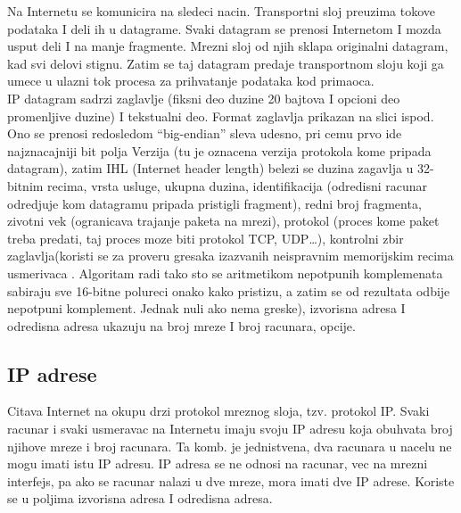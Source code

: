 \documentclass{article} %
\begin{document}
Na Internetu se komunicira na sledeci nacin. Transportni sloj preuzima tokove podataka I deli ih u datagrame. Svaki datagram se prenosi Internetom I mozda usput deli I na  manje fragmente. Mrezni sloj od njih sklapa originalni datagram, kad svi delovi stignu. Zatim se taj datagram predaje transportnom sloju koji ga umece u ulazni tok procesa za prihvatanje podataka kod primaoca.\\

IP datagram sadrzi zaglavlje (fiksni deo duzine 20 bajtova I opcioni deo promenljive duzine) I tekstualni deo. Format zaglavlja prikazan na slici ispod. Ono se prenosi redosledom  “big-endian” sleva udesno, pri cemu prvo ide najznacajniji bit polja Verzija (tu je oznacena verzija protokola kome pripada datagram), zatim IHL (Internet header length) belezi se duzina zagavlja u 32-bitnim recima, vrsta usluge, ukupna duzina, identifikacija (odredisni racunar odredjuje kom  datagramu pripada pristigli fragment), redni broj fragmenta, zivotni vek (ogranicava trajanje paketa na mrezi), protokol (proces kome paket treba predati, taj proces moze biti protokol TCP, UDP…), kontrolni zbir zaglavlja(koristi se za proveru gresaka izazvanih neispravnim memorijskim recima usmerivaca . Algoritam radi tako sto se aritmetikom nepotpunih komplemenata sabiraju sve 16-bitne polureci onako kako pristizu, a zatim se od rezultata odbije nepotpuni komplement. Jednak nuli ako nema greske), izvorisna adresa I odredisna adresa ukazuju na broj mreze I broj racunara, opcije.
\subsection{IP adrese}
Citava Internet na okupu drzi protokol mreznog sloja, tzv. protokol IP.
Svaki racunar i svaki usmeravac na Internetu imaju svoju IP adresu koja obuhvata broj njihove mreze i broj racunara. Ta komb. je jednistvena, dva racunara u nacelu ne mogu imati istu IP adresu. IP adresa se ne odnosi na racunar,  vec na mrezni interfejs, pa ako se racunar nalazi u dve mreze, mora imati dve IP adrese. Koriste se u poljima izvorisna adresa I odredisna adresa. \\
\end{document}
